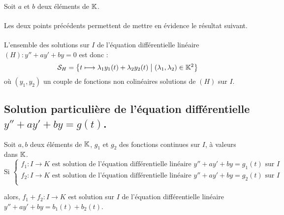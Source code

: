 \begin{defprop}
    Soit \(a\) et \(b\) deux éléments de \(\mathbb{K}\).\\~\\
    Les deux points précédents permettent de mettre en évidence le résultat suivant.\\~\\
    L’ensemble des solutions sur \(I\) de l’équation différentielle linéaire \((H) : y'' + ay' + by = 0\) est donc :
    \[\mathcal{S}_H = \left\lbrace t \longmapsto \lambda_1 y_1 (t) + \lambda_2 y_2 (t) \;\middle|\; \left(\lambda_1,\lambda_2\right) \in \mathbb{K} ^2 \right\rbrace\]
    où \((y_1, y_2)\) un couple de fonctions non colinéaires solutions de \((H)\) sur \(I\).
\end{defprop}

\subsection{Solution particulière de l’équation différentielle \(y'' + ay' + by = g(t)\).}

\begin{defprop}
    Soit \(a, b\) deux éléments de \(\mathbb{K}\), \(g_1\) et \(g_2\) des fonctions continues sur \(I\), à valeurs dans \(\mathbb{K}\).
    \[\text{Si }\begin{cases}
        f_1 : I \to K \text{ est solution de l’équation différentielle linéaire } y'' + ay' + by= g_1(t) \text{ sur } I\\
        f_2 : I \to K \text{ est solution de l’équation différentielle linéaire } y'' + ay' + by= g_2(t) \text{ sur } I\\
    \end{cases}\]

    alors, \( f_1 + f_2 : I \to K\) est solution sur \(I\) de l’équation différentielle linéaire \(y'' + ay' + by = b_1(t) + b_2(t)\).
\end{defprop}

